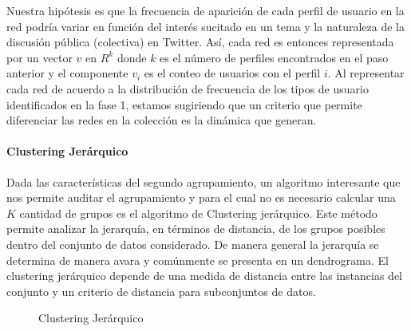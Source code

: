 Nuestra hipótesis es que la frecuencia de aparición de cada perfil de usuario en la red podría variar en función del interés sucitado en un tema y la naturaleza de la discusión pública (colectiva) en Twitter. Así, cada red es entonces representada por un vector $v$ en ${R}^k$ donde $k$ es el número de perfiles encontrados en el paso anterior y el componente $v_i$ es el conteo de usuarios con el perfil $i$. Al representar cada red de acuerdo a la distribución de frecuencia de los tipos de usuario identificados en la fase 1, estamos sugiriendo que un criterio que permite diferenciar las redes en la colección es la dinámica que generan. 


\paragraph{Clustering Jerárquico}


Dada las características del segundo agrupamiento, un algoritmo interesante que nos permite auditar el agrupamiento y para el cual no es necesario calcular una $K$ cantidad de grupos es el algoritmo de Clustering jerárquico. Este método permite analizar la jerarquía, en términos de distancia, de los grupos posibles dentro del conjunto de datos considerado. De manera general la jerarquía se determina de manera avara y comúnmente se presenta en un dendrograma. El clustering jerárquico depende de una medida de distancia entre las instancias del conjunto y un criterio de distancia para subconjuntos de datos. 

\begin{figure}[htbp]
  \centering
  
    \caption{Clustering Jerárquico}
    \label{fig:hierarchy}
\end{figure}


